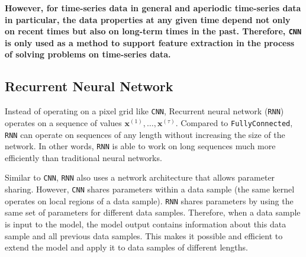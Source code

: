 \textbf{However, for time-series data in general and aperiodic time-series data in particular, the data properties at any given time depend not only on recent times but also on long-term times in the past. Therefore, \Verb|CNN| is only used as a method to support feature extraction in the process of solving problems on time-series data.}


\subsection{Recurrent Neural Network}


Instead of operating on a pixel grid like \verb|CNN|, Recurrent neural network (\verb|RNN|) \cite{rumelhart1986learning} operates on a sequence of values $\mathbf{x}^{(1)},\dots,\mathbf{x}^{(\tau)}$. Compared to \verb|FullyConnected|, \verb|RNN| can operate on sequences of any length without increasing the size of the network. In other words, \verb|RNN| is able to work on long sequences much more efficiently than traditional neural networks.


Similar to \verb|CNN|, \verb|RNN| also uses a network architecture that allows parameter sharing. However, \verb|CNN| shares parameters within a data sample (the same kernel operates on local regions of a data sample). \verb|RNN| shares parameters by using the same set of parameters for different data samples. Therefore, when a data sample is input to the model, the model output contains information about this data sample and all previous data samples. This makes it possible and efficient to extend the model and apply it to data samples of different lengths.

